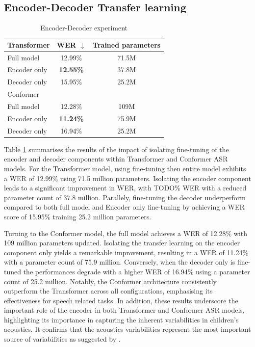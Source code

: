 
\subsection{Encoder-Decoder Transfer learning}
\begin{table}
    \begin{center}
        \begin{tabular}{lcc}\hline
            Transformer    &   WER $\downarrow$    & Trained parameters  \\ \hline
            Full model          & 12.99\% & 71.5M   \\
            Encoder only & \textbf{12.55\%} & 37.8M  \\
            Decoder only & 15.95\% & 25.2M  \\ \hline \hline
            Conformer    &    & \\ \hline
            Full model          & 12.28\% & 109M   \\
            Encoder only & \textbf{11.24\%} & 75.9M  \\
            Decoder only & 16.94\% & 25.2M  \\ \hline 

        \end{tabular}
    \end{center}
    \caption{Encoder-Decoder experiment}
    \label{tab:EncoderDecoder}
\end{table}
Table \ref{tab:EncoderDecoder} summarises the results of the impact of isolating fine-tuning of the encoder and decoder components within Transformer and Conformer ASR models. For the Transformer model, using fine-tuning then entire model exhibits a WER of 12.99\% using 71.5 million parameters. Isolating the encoder component leads to a significant improvement in WER, with TODO\% WER with a reduced parameter count of 37.8 million. Parallely, fine-tuning the decoder underperform compared to both full model and Encoder only fine-tuning by achieving a WER score of 15.95\% training 25.2 million parameters. 

Turning to the Conformer model, the full model achieves a WER of 12.28\% with 109 million parameters updated. Isolating the transfer learning on the encoder component only  yields a remarkable improvement, resulting in a WER of 11.24\% with a parameter count of 75.9 million. Conversely, when the decoder only is fine-tuned the performances degrade with a higher WER of 16.94\% using a parameter count of 25.2 million. Notably, the Conformer architecture consistently outperform the Transformer across all configurations, emphasising its effectiveness for speech related tasks. In addition, these results underscore the important role of the encoder in both Transformer and Conformer ASR models, highlighting its importance in capturing the inherent variabilities in children's acoustics. It confirms that the acoustics variabilities represent the most important source of variabilities as suggested by \cite{TFchildren}.

